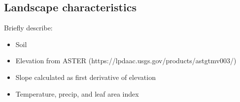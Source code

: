\subsection{Landscape characteristics}

Briefly describe: 

\begin{itemize}
    \item Soil
    \item Elevation from ASTER (https://lpdaac.usgs.gov/products/astgtmv003/)
    \item Slope calculated as first derivative of elevation 
    \item Temperature, precip, and leaf area index
\end{itemize}

